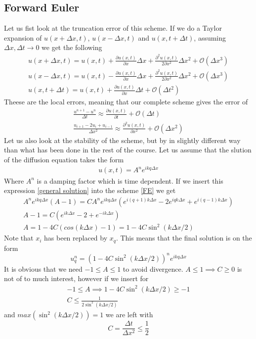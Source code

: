 \documentclass[a4paper,english, 10pt, twoside]{article}
\begin{document}
\subsection{Forward Euler}
Let us fist look at the truncation error of this scheme. If we do a Taylor expansion of $u(x+\Delta x,t)$, $u(x-\Delta x,t)$ 
and $u(x,t+\Delta t)$, assuming $\Delta x,\Delta t \to 0$ we get the following
\begin{align*}
 u(x+\Delta x,t) = u(x,t) + \frac{\partial u(x,t)}{\partial x}\Delta x +\frac{\partial^2u(x,t)}{2\partial x^2}\Delta x^2 
 +\mathcal{O}(\Delta x^3)\\
 u(x-\Delta x,t) = u(x,t) - \frac{\partial u(x,t)}{\partial x}\Delta x +\frac{\partial^2u(x,t)}{2\partial x^2}\Delta x^2 
 +\mathcal{O}(\Delta x^3) \\
  u(x,t+\Delta t) = u(x,t) + \frac{\partial u(x,t)}{\partial x}\Delta t +\mathcal{O}(\Delta t^2)
 \end{align*}
Theese are the local errors, meaning that our complete scheme gives the error of 
\begin{align*}
 \frac{u^{n+1}-u^n}{\Delta t} \approx \frac{\partial u(x,t)}{\partial t} +\mathcal{O}(\Delta t)\\
 \frac{u_{i+1}-2u_i +u_{i-1}}{\Delta x^2} \approx \frac{\partial^2 u(x,t)}{\partial x^2} +\mathcal{O}(\Delta x^2)
\end{align*}
Let us also look at the stability of the scheme, but by in slightly different way than what has been done in the rest of the 
course. Let us assume that the slution of the diffusion equation takes the form
\begin{align}\label{general solution}
 u(x,t) = A^ne^{ikq\Delta x}
\end{align}
Where $A^n$ is a damping factor which is time dependent. If we insert this expression \ref{general solution} into the scheme 
\ref{FE} we get
\begin{align*}
 A^ne^{ikq\Delta x}(A-1) = CA^ne^{ikq\Delta x}(e^{i(q+1)k\Delta x}-2e^{iqk\Delta x} +e^{i(q-1)k \Delta x})\\
 A-1 = C(e^{ik\Delta x}-2+e^{-ik \Delta x})\\
 A = 1 - 4C(cos(k\Delta x)-1) = 1 -4C\sin^2(k\Delta x/2)
\end{align*}
Note that $x_i$ has been replaced by $x_q$. This means that the final solution is on the form
\begin{equation*}
 u^n_q = \left(1 -4C\sin^2(k\Delta x/2)\right)^ne^{ikq\Delta x}
\end{equation*}
It is obvious that we need $-1\leq A\leq 1$ to avoid divergence. $A\leq 1 \implies C\geq 0$ is not of to much interest, however 
if we insert for 
\begin{align*}
 -1 \leq A \implies 1 -4C\sin^2(k\Delta x/2) \geq -1 \\
 C \leq \frac{1}{2\sin^2(k\Delta x/2)}
\end{align*}
and $max(\sin^2(k\Delta x/2)) = 1$ we are left with
\begin{equation}\label{stability criterion}
 C = \frac{\Delta t}{\Delta x^2} \leq \frac{1}{2}
\end{equation}
\end{document}
